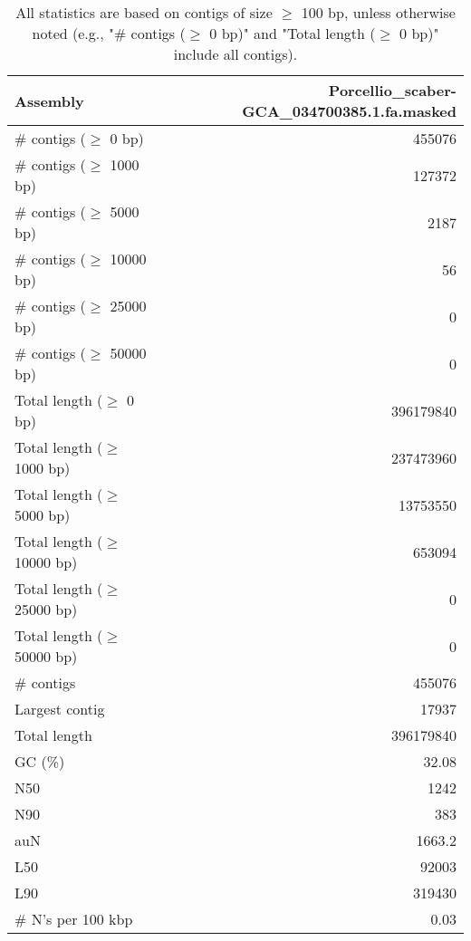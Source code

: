 \documentclass[12pt,a4paper]{article}
\begin{document}
\begin{table}[ht]
\begin{center}
\caption{All statistics are based on contigs of size $\geq$ 100 bp, unless otherwise noted (e.g., "\# contigs ($\geq$ 0 bp)" and "Total length ($\geq$ 0 bp)" include all contigs).}
\begin{tabular}{|l*{1}{|r}|}
\hline
Assembly & Porcellio\_scaber-GCA\_034700385.1.fa.masked \\ \hline
\# contigs ($\geq$ 0 bp) & 455076 \\ \hline
\# contigs ($\geq$ 1000 bp) & 127372 \\ \hline
\# contigs ($\geq$ 5000 bp) & 2187 \\ \hline
\# contigs ($\geq$ 10000 bp) & 56 \\ \hline
\# contigs ($\geq$ 25000 bp) & 0 \\ \hline
\# contigs ($\geq$ 50000 bp) & 0 \\ \hline
Total length ($\geq$ 0 bp) & 396179840 \\ \hline
Total length ($\geq$ 1000 bp) & 237473960 \\ \hline
Total length ($\geq$ 5000 bp) & 13753550 \\ \hline
Total length ($\geq$ 10000 bp) & 653094 \\ \hline
Total length ($\geq$ 25000 bp) & 0 \\ \hline
Total length ($\geq$ 50000 bp) & 0 \\ \hline
\# contigs & 455076 \\ \hline
Largest contig & 17937 \\ \hline
Total length & 396179840 \\ \hline
GC (\%) & 32.08 \\ \hline
N50 & 1242 \\ \hline
N90 & 383 \\ \hline
auN & 1663.2 \\ \hline
L50 & 92003 \\ \hline
L90 & 319430 \\ \hline
\# N's per 100 kbp & 0.03 \\ \hline
\end{tabular}
\end{center}
\end{table}
\end{document}

